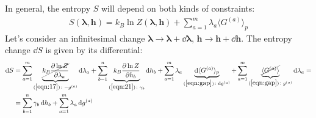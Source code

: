 \documentclass[../../main.tex]{subfiles}
\begin{document}

In general, the entropy $S$ will depend on both kinds of constraints:
\begin{align}\label{eqn:22}
    S(\bm{\lambda}, \bm{h}) = k_B \ln Z(\bm{\lambda}, \bm{h}) + \sum_{a=1}^m \lambda_a \langle G^{(a)} \rangle_p
\end{align}
Let's consider an infinitesimal change $\bm{\lambda} \to \bm{\lambda} +\dd{\bm{\lambda}}$, $\bm{h} \to \bm{h} + \dd{\bm{h}}$. The entropy change $\dd{S}$ is given by its differential:
\begin{align}\label{eqn:23}
    \dd{S} &= \sum_{a=1}^m \underbrace{\cancel{k_B \pdv{\ln Z}{\lambda_a}}}_{(\ref{eqn:17})\colon -g^{(a)}} \dd{\lambda_a} + \sum_{b=1}^n \underbrace{k_B \pdv{\ln Z}{h_b}}_{(\ref{eqn:21})\colon \gamma_b} \dd{h_b} + \sum_{a=1}^m \lambda_a \underbrace{\dd{\langle G^{(a)} \rangle_p}}_{(\ref{eqn:gap}) \colon \dd{g^{(a)}}} + \sum_{a=1}^m \underbrace{\cancel{\langle G^{(a)} \rangle}}_{(\ref{eqn:gap})\colon g^{(a)}}\dd{\lambda_a} =\\ \nonumber
    &= \sum_{b=1}^n \gamma_b \dd{h_b} + \sum_{a=1}^m \lambda_a \dd{g^{(a)}}
\end{align}
\end{document}

